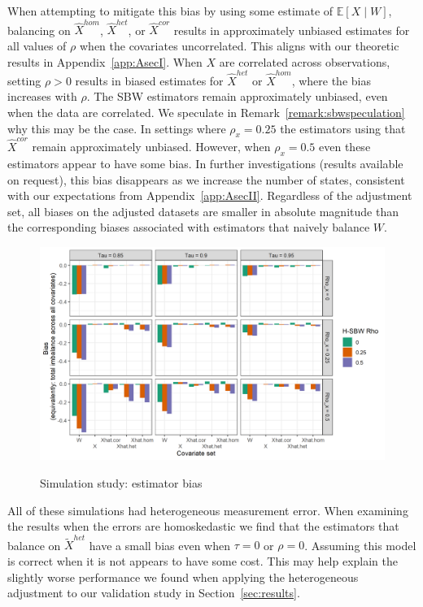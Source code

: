 When attempting to mitigate this bias by using some estimate of $\mathbb{E}[X \mid W]$, balancing on $\hat{X}^{hom}$, $\hat{X}^{het}$, or $\hat{X}^{cor}$ results in approximately unbiased estimates for all values of $\rho$ when the covariates uncorrelated. This aligns with our theoretic results in Appendix~\ref{app:AsecI}. When $X$ are correlated across observations, setting $\rho > 0$ results in biased estimates for $\hat{X}^{het}$ or $\hat{X}^{hom}$, where the bias increases with $\rho$. The SBW estimators remain approximately unbiased, even when the data are correlated. We speculate in Remark~\ref{remark:sbwspeculation} why this may be the case. In settings where $\rho_x = 0.25$ the estimators using that $\hat{X}^{cor}$ remain approximately unbiased. However, when $\rho_x = 0.5$ even these estimators appear to have some bias. In further investigations (results available on request), this bias disappears as we increase the number of states, consistent with our expectations from Appendix~\ref{app:AsecII}. Regardless of the adjustment set, all biases on the adjusted datasets are smaller in absolute magnitude than the corresponding biases associated with estimators that naively balance $W$. 

\begin{figure}[H]
\begin{center}
    \caption{Simulation study: estimator bias}\label{fig:simbias}
    \label{fig:loveplotc1}
    \includegraphics[scale=0.5]{01_Plots/bias-plot.png}
\end{center}
\end{figure}

All of these simulations had heterogeneous measurement error. When examining the results when the errors are homoskedastic we find that the estimators that balance on $\tilde{X}^{het}$ have a small bias even when $\tau = 0$ or $\rho = 0$. Assuming this model is correct when it is not appears to have some cost. This may help explain the slightly worse performance we found when applying the heterogeneous adjustment to our validation study in Section~\ref{sec:results}.

